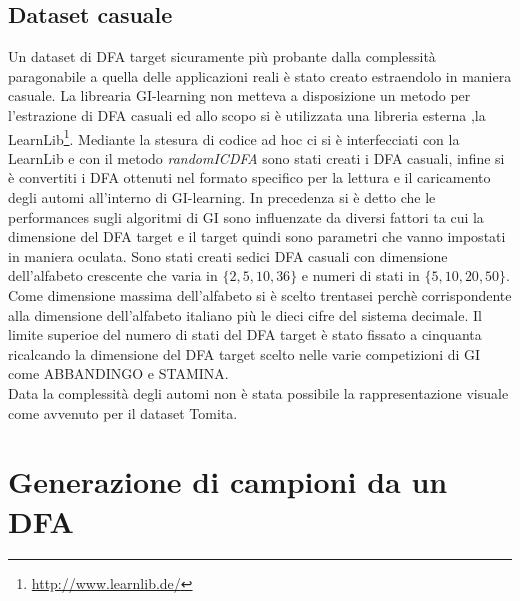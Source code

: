 \subsection{Dataset casuale}
Un dataset di \ac{DFA} target sicuramente più probante dalla complessità paragonabile a quella delle applicazioni reali è stato creato estraendolo in maniera casuale. La librearia GI-learning non metteva a disposizione un metodo per l'estrazione di \ac{DFA} casuali ed allo scopo si è utilizzata una libreria esterna ,la LearnLib\footnote{\href{http://www.learnlib.de/}{http://www.learnlib.de/}}. Mediante la stesura di codice ad hoc ci si è interfecciati con la LearnLib e con il metodo \textit{randomICDFA} sono stati creati i \ac{DFA} casuali, infine si è convertiti i \ac{DFA} ottenuti nel formato specifico per la lettura e il caricamento degli automi all'interno di GI-learning. 
In precedenza si è detto che le performances sugli algoritmi di  \ac{GI} sono influenzate da diversi fattori ta cui la dimensione del \ac{DFA} target e il target quindi sono parametri che vanno impostati in maniera oculata.
Sono stati creati sedici \ac{DFA} casuali con dimensione dell'alfabeto crescente che varia in $\{2,5,10,36\}$ e numeri di stati in $\{5,10,20,50\}$. Come dimensione massima dell'alfabeto si è scelto trentasei perchè corrispondente alla dimensione dell'alfabeto italiano più le dieci cifre del sistema decimale. Il limite superioe del numero di stati del \ac{DFA} target è stato fissato a cinquanta ricalcando la dimensione del \ac{DFA} target scelto   nelle varie competizioni di \ac{GI} come ABBANDINGO e STAMINA.\\
Data la complessità degli automi non è stata possibile la rappresentazione visuale come avvenuto per il dataset Tomita.


\section[Gen. campioni da DFA]{Generazione di campioni da un DFA}
\label{sec:gensam}


